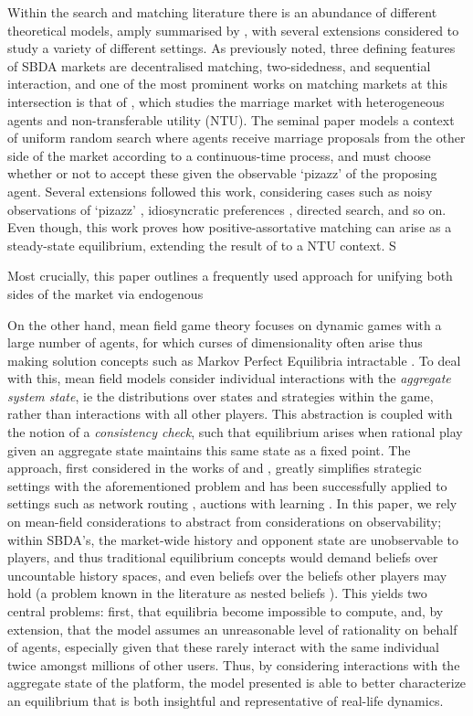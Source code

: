 Within the search and matching literature there is an abundance of different theoretical models, amply summarised by \cite{chade2017sorting}, with several extensions considered to study a variety of different settings. As previously noted, three defining features of SBDA markets are decentralised matching, two-sidedness, and sequential interaction, and one of the most prominent works on matching markets at this intersection is that of \cite{burdett1997marriage}, which studies the marriage market with heterogeneous agents and non-transferable utility (NTU). The seminal paper models a context of uniform random search where agents receive marriage proposals from the other side of the market according to a continuous-time process, and must choose whether or not to accept these given the observable `pizazz' of the proposing agent. Several extensions followed this work, considering cases such as noisy observations of `pizazz' \citep{chade2006matching}, idiosyncratic preferences \cite{burdett1998two}, directed search, and so on. Even though, this work proves how positive-assortative matching can arise as a steady-state equilibrium, extending the result of \cite{becker1973theory} to a NTU context. S

Most crucially, this paper outlines a frequently used approach for unifying both sides of the market via endogenous

On the other hand, mean field game theory focuses on dynamic games with a large number of agents, for which curses of dimensionality often arise thus making solution concepts such as Markov Perfect Equilibria intractable \cite{maskin2001markov}. To deal with this, mean field models consider individual interactions with the \textit{aggregate system state}, ie the distributions over states and strategies within the game, rather than interactions with all other players. This abstraction is coupled with the notion of a \textit{consistency check}, such that equilibrium arises when rational play given an aggregate state maintains this same state as a fixed point. The approach, first considered in the works of \cite{jovanovic1988anonymous} and \cite{hopenhayn1992entry}, greatly simplifies strategic settings with the aforementioned problem and has been successfully applied to settings such as network routing \cite{calderone2017markov}, auctions with learning \cite{iyer2014mean}. In this paper, we rely on mean-field considerations to abstract from considerations on observability; within SBDA's, the market-wide history and opponent state are unobservable to players, and thus traditional equilibrium concepts would demand beliefs over uncountable history spaces, and even beliefs over the beliefs other players may hold (a problem known in the literature as nested beliefs \cite{brandenburger1993hierarchies}). This yields two central problems: first, that equilibria become impossible to compute, and, by extension, that the model assumes an unreasonable level of rationality on behalf of agents, especially given that these rarely interact with the same individual twice amongst millions of other users. Thus, by considering interactions with the aggregate state of the platform, the model presented is able to better characterize an equilibrium that is both insightful and representative of real-life dynamics.

